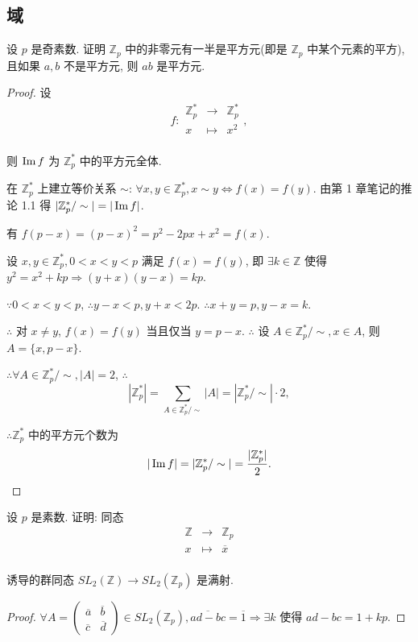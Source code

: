 \documentclass[color=black,device=normal,lang=cn,mode=geye]{elegantnote}
\begin{document}
\subsection{域}
\begin{exercisec}[5.4.6]
    设 $p$ 是奇素数. 证明 $\mathbb{Z}_p$ 中的非零元有一半是平方元(即是 $\mathbb{Z}_p$ 中某个元素的平方), 且如果 $a,b$ 不是平方元, 则 $ab$ 是平方元.
\end{exercisec}
\begin{proof}
    设
    \[f:\begin{array}{rcl}
        \mathbb{Z}_p^* & \to & \mathbb{Z}_p^* \\
        x & \mapsto & x^2 \\
    \end{array},\]

    则 $\operatorname{Im} f$ 为 $\mathbb{Z}_p^*$ 中的平方元全体.

    在 $\mathbb{Z}_p^*$ 上建立等价关系 $\sim$: $\forall x,y\in\mathbb{Z}_p^*,x\sim y\Leftrightarrow f(x)= f(y)$. 由第 1 章笔记的推论 1.1 得 $|\mathbb{Z}_p^*/\sim|=|\operatorname{Im} f|$.

    有 $f(p-x)=(p-x)^2=p^2-2px+x^2=f(x)$.
    
    设 $x,y\in\mathbb{Z}_p^*,0<x<y<p$ 满足 $f(x)=f(y)$, 即 $\exists k\in\mathbb{Z}$ 使得 $y^2=x^2+kp\Rightarrow(y+x)(y-x)=kp$.

    $\because0<x<y<p$, $\therefore y-x<p,y+x<2p$. $\therefore x+y=p,y-x=k$.

    $\therefore$ 对 $x\neq y$, $f(x)=f(y)$ 当且仅当 $y=p-x$. $\therefore$ 设 $A\in\mathbb{Z}_p^*/\sim,x\in A$, 则 $A=\{x,p-x\}$.

    $\therefore\forall A\in\mathbb{Z}_p^*/\sim,|A|=2$, $\therefore$
    \[|\mathbb{Z}_p^*|=\sum\limits_{A\in\mathbb{Z}_p^*/\sim}|A|=|\mathbb{Z}_p^*/\sim|\cdot2,\]

    $\therefore\mathbb{Z}_p^*$ 中的平方元个数为
    \[|\operatorname{Im} f|=|\mathbb{Z}_p^*/\sim|=\dfrac{|\mathbb{Z}_p^*|}{2}.\]
\end{proof}
\begin{exercisec}[5.4.7]
    设 $p$ 是素数. 证明: 同态
    \[\begin{array}{rcl}
        \mathbb{Z} & \to & \mathbb{Z}_p \\
        x & \mapsto & \overline{x} \\
    \end{array}\]

    诱导的群同态 $ SL_2(\mathbb{Z})\to SL_2(\mathbb{Z}_p)$ 是满射.
\end{exercisec}
\begin{proof}
    $\forall A=\begin{pmatrix} \overline{a} & \overline{b} \\ \overline{c} & \overline{d} \end{pmatrix}\in SL_2(\mathbb{Z}_p),\overline{ad-bc}=\overline{1}\Rightarrow\exists k$ 使得 $ad-bc=1+kp$.
\end{proof}
\end{document}
